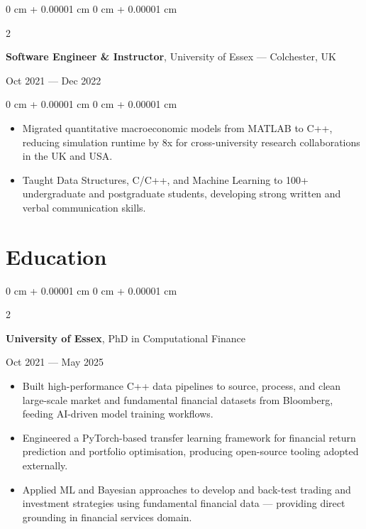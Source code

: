 \documentclass[6pt, letterpaper]{article}
\newenvironment{highlights}{
    \begin{itemize}[
        topsep=0.03 cm,
        parsep=0.03 cm,
        partopsep=0pt,
        itemsep=0pt,
        leftmargin=0 cm + 10pt
    ]
}{
    \end{itemize}
} %
\newenvironment{onecolentry}{
    \begin{adjustwidth}{
        0 cm + 0.00001 cm
    }{
        0 cm + 0.00001 cm
    }
}{
    \end{adjustwidth}
} %
\newenvironment{twocolentry}[2][]{
    \onecolentry
    \def\secondColumn{#2}
    \setcolumnwidth{\fill, 4.5 cm}
    \begin{paracol}{2}
}{
    \switchcolumn \raggedleft \secondColumn
    \end{paracol}
    \endonecolentry
} %
\begin{document}
        \begin{twocolentry}{Oct 2021 --- Dec 2022}
        \textbf{Software Engineer \& Instructor}, University of Essex --- Colchester, UK
        \end{twocolentry}

        \begin{onecolentry}
        \begin{highlights}
        \item Migrated quantitative macroeconomic models from MATLAB to C++, reducing simulation runtime by 8x for cross-university research collaborations in the UK and USA.
        \item Taught Data Structures, C/C++, and Machine Learning to 100+ undergraduate and postgraduate students, developing strong written and verbal communication skills.
        \end{highlights}
        \end{onecolentry}

    \section{Education}

            \begin{twocolentry}{
                Oct 2021 --- May 2025
            }
            \textbf{University of Essex}, PhD in Computational Finance
            \end{twocolentry}

            \begin{highlights}
            \item Built high-performance C++ data pipelines to source, process, and clean large-scale market and fundamental financial datasets from Bloomberg, feeding AI-driven model training workflows.
            \item Engineered a PyTorch-based transfer learning framework for financial return prediction and portfolio optimisation, producing open-source tooling adopted externally.
            \item Applied ML and Bayesian approaches to develop and back-test trading and investment strategies using fundamental financial data — providing direct grounding in financial services domain.
            \end{highlights}
\end{document}
